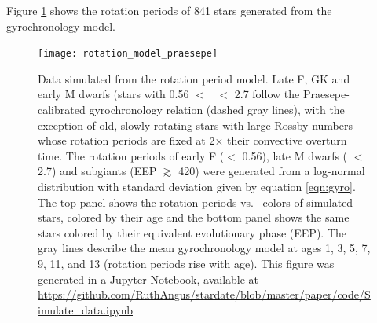 Figure \ref{fig:rotation_model} shows the rotation periods of 841
stars generated from the gyrochronology model.
\begin{figure}
  \caption{
Data simulated from the rotation period model.
    Late F, GK and early M dwarfs (stars with 0.56 $<$ \gcolor\ $<$ 2.7 follow
    the Praesepe-calibrated gyrochronology relation (dashed gray lines), with
    the exception of old, slowly
    rotating stars with large Rossby numbers whose rotation periods are fixed
    at 2$\times$ their convective overturn time.
    The rotation periods of early F (\gcolor $<$ 0.56), late M dwarfs (\gcolor
    $<$ 2.7) and subgiants (EEP $\gtrsim$ 420) were generated
    from a log-normal distribution with standard deviation given by equation
    \ref{eqn:gyro}.
The top panel shows the rotation periods vs. \gcolor\ colors of simulated stars,
    colored by their age and the bottom panel shows the same stars colored
    by their equivalent evolutionary phase (EEP).
    The gray lines describe the mean gyrochronology model at ages 1,
    3, 5, 7, 9, 11, and 13 (rotation periods rise with age).
    This figure was generated in a Jupyter Notebook, available at
    \url{https://github.com/RuthAngus/stardate/blob/master/paper/code/Simulate_data.ipynb}
}
  \centering
    \texttt{[image: rotation\_model\_praesepe]}
\label{fig:rotation_model}
\end{figure}


